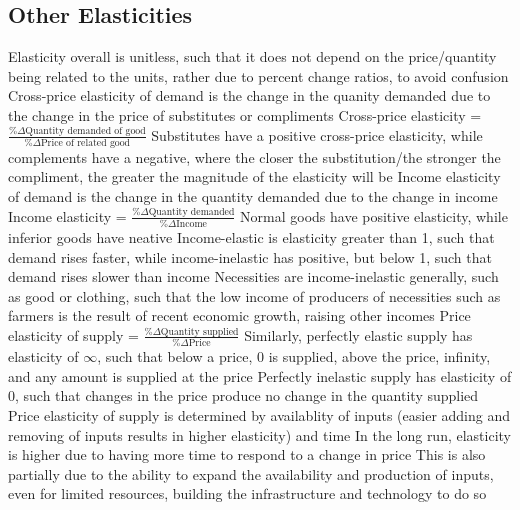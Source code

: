 \documentclass[11 pt, twoside]{article}
\newenvironment{outline*}
{
	\begin{outline}[enumerate]
	}
	{\end{outline}
}
\begin{document}
\subsection{Other Elasticities}
\begin{outline*}
\1 Elasticity overall is unitless, such that it does not depend on the price/quantity being related to the units, rather due to percent change ratios, to avoid confusion
\1 Cross-price elasticity of demand is the change in the quanity demanded due to the change in the price of substitutes or compliments
\2 Cross-price elasticity = $\frac{\% \Delta \text{Quantity demanded of good}}{\% \Delta \text{Price of related good}}$
\2 Substitutes have a positive cross-price elasticity, while complements have a negative, where the closer the substitution/the stronger the compliment, the greater the magnitude of the elasticity will be
\1 Income elasticity of demand is the change in the quantity demanded due to the change in income
\2 Income elasticity = $\frac{\% \Delta \text{Quantity demanded}}{\% \Delta \text{Income}}$
\2 Normal goods have positive elasticity, while inferior goods have neative
\2 Income-elastic is elasticity greater than 1, such that demand rises faster, while income-inelastic has positive, but below 1, such that demand rises slower than income
\3 Necessities are income-inelastic generally, such as good or clothing, such that the low income of producers of necessities such as farmers is the result of recent economic growth, raising other incomes
\1 Price elasticity of supply = $\frac{\% \Delta \text{Quantity supplied}}{\% \Delta \text{Price}}$
\2 Similarly, perfectly elastic supply has elasticity of $\infty$, such that below a price, 0 is supplied, above the price, infinity, and any amount is supplied at the price
\2 Perfectly inelastic supply has elasticity of 0, such that changes in the price produce no change in the quantity supplied
\2 Price elasticity of supply is determined by availablity of inputs (easier adding and removing of inputs results in higher elasticity) and time
\3 In the long run, elasticity is higher due to having more time to respond to a change in price
\3 This is also partially due to the ability to expand the availability and production of inputs, even for limited resources, building the infrastructure and technology to do so
\end{outline*}
\end{document}
